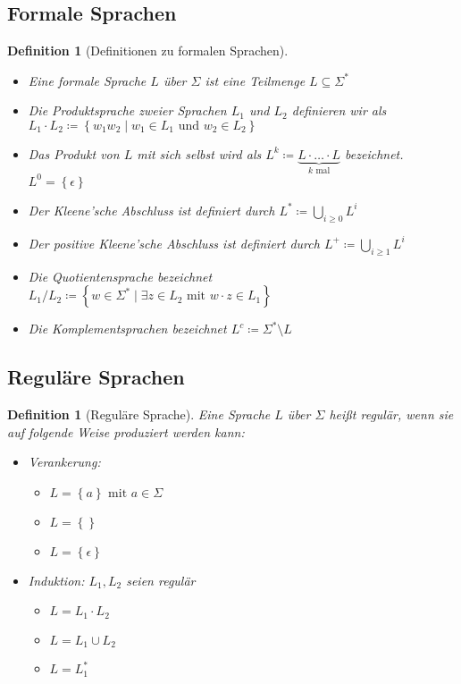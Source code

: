 \documentclass[11pt]{scrartcl}
\newcommand{\set}[1]{\left\lbrace #1\right\rbrace}
\theoremstyle{break}
\newtheorem{defi}[satz]{Definition}
\begin{document}
    \subsection{Formale Sprachen}
	\label{subsec:formale-sprachen}

    \begin{defi}[Definitionen zu formalen Sprachen]
        \begin{itemize}
            \item Eine formale Sprache $L$ über $\Sigma$ ist eine Teilmenge $L\subseteq\Sigma^*$
            \item Die Produktsprache zweier Sprachen $L_1$ und $L_2$ definieren wir als\\ $L_1\cdot L_2\coloneqq\set{w_{1}w_{2}\mid w_{1}\in L_{1}\text{ und } w_{2}\in L_2}$
            \item Das Produkt von $L$ mit sich selbst wird als $L^k\coloneqq \underbrace{L\cdot\dots\cdot L}_{k\text{ mal}}$ bezeichnet. $L^0 = \set{\epsilon}$
            \item Der Kleene'sche Abschluss ist definiert durch $L^*\coloneqq \bigcup\limits_{i\geq 0} L^i$
            \item Der positive Kleene'sche Abschluss ist definiert durch $L^+\coloneqq \bigcup\limits_{i\geq 1} L^i$
            \item Die Quotientensprache bezeichnet $L_1/L_2\coloneqq\set{w\in \Sigma^*\mid\exists z\in L_2\text{ mit } w\cdot z\in L_1}$
            \item Die Komplementsprachen bezeichnet $L^c\coloneqq\Sigma^*\setminus L$
        \end{itemize}
    \end{defi}


    \subsection{Reguläre Sprachen}
	\label{subsec:reguläre-sprachen}

    \begin{defi}[Reguläre Sprache]
        Eine Sprache $L$ über $\Sigma$ heißt regulär, wenn sie auf folgende Weise produziert werden kann:
        \begin{itemize}
            \item Verankerung:
            \begin{itemize}
                \item $L=\set{a}\text{ mit } a\in\Sigma$
                \item $L=\set{}$
                \item $L=\set{\epsilon}$
            \end{itemize}
            \item Induktion: $L_1,L_2$ seien regulär
            \begin{itemize}
                \item $L=L_1\cdot L_2$
                \item $L=L_1\cup L_2$
                \item $L=L_1^*$
            \end{itemize}
        \end{itemize}
    \end{defi}
\end{document}
